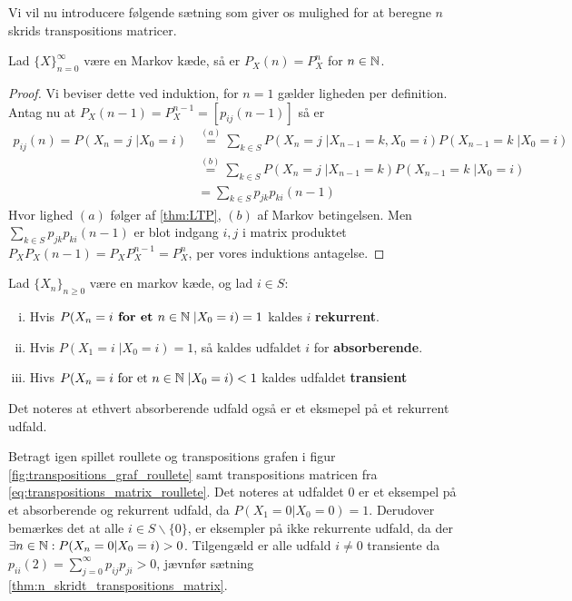 Vi vil nu introducere følgende sætning som giver os mulighed for at beregne $n$ skrids transpositions matricer.
\begin{thm} \label{thm:n_skrids_transpositions_matrix}
Lad $\{X\}_{n = 0}^\infty$ være en Markov kæde, så er $P_X(n) = P_X^n$ for $n \in \mathbb{N}$.
\end{thm}
\begin{proof}
Vi beviser dette ved induktion, for $n = 1$ gælder ligheden per definition. Antag nu at $P_X(n - 1) = P_X^{n - 1} = [p_{ij}(n - 1)]$ så er 
\begin{align*} 
    p_{ij}(n) = P(X_n = j \;| X_0 = i) &\stackrel{(a)}= \sum_{k \in S} P(X_n = j\; | X_{n - 1} = k, X_0 = i) P(X_{n - 1} = k\; | X_0 = i) \\
    &\stackrel{(b)}= \sum_{k \in S} P(X_n = j\; | X_{n - 1} = k) P(X_{n - 1} = k\; | X_0 = i) \\
    &= \sum_{k \in S} p_{jk}p_{ki}(n - 1) 
\end{align*}
Hvor lighed $(a)$ følger af \ref{thm:LTP}, $(b)$ af Markov betingelsen. Men $\displaystyle \sum_{k \in S} p_{jk}p_{ki}(n - 1)$ er blot indgang $i, j$ i matrix produktet $P_X P_X(n - 1) = P_X P_X^{n - 1} = P_X^n$, per vores induktions antagelse.
\end{proof}

\begin{defn}
  Lad $\{X_{n}\}_{n \geq 0}$ være en markov kæde, og lad $i \in S$:
  \begin{enumerate}[i)]
    \item Hvis $P(X_{n} = i \textbf{ for et } n \in \mathbb{N} \;| X_{0} = i) = 1$ kaldes $i$ \textbf{rekurrent}.
    \item Hvis $P(X_{1} = i \;| X_{0} = i) = 1$, så kaldes udfaldet $i$ for \textbf{absorberende}.
    \item Hivs $P(X_n = i \text{ for et } n \in \mathbb{N} \;| X_0 = i) < 1$ kaldes udfaldet \textbf{transient}
  \end{enumerate}
\end{defn}

\begin{remark}
  Det noteres at ethvert absorberende udfald også er et eksmepel på et rekurrent udfald.
\end{remark}

\begin{example}
  Betragt igen spillet roullete og transpositions grafen i figur \ref{fig:transpositions_graf_roullete} samt transpositions matricen fra \ref{eq:transpositions_matrix_roullete}. Det noteres at udfaldet $0$ er et eksempel på et absorberende og rekurrent udfald, da $P(X_{1} = 0 | X_{0} = 0) = 1$. Derudover bemærkes det at alle $i \in S \backslash \{0\}$, er eksempler på ikke rekurrente udfald, da der $\exists n \in \mathbb{N}: P(X_{n} = 0 | X_{0} = i) > 0$. Tilgengæld er alle udfald $i \neq 0$ transiente da $p_{ii}(2) = \sum_{j=0}^{\infty} p_{ij}p_{ji} > 0$, jævnfør sætning \ref{thm:n_skridt_transpositions_matrix}.
\end{example}

